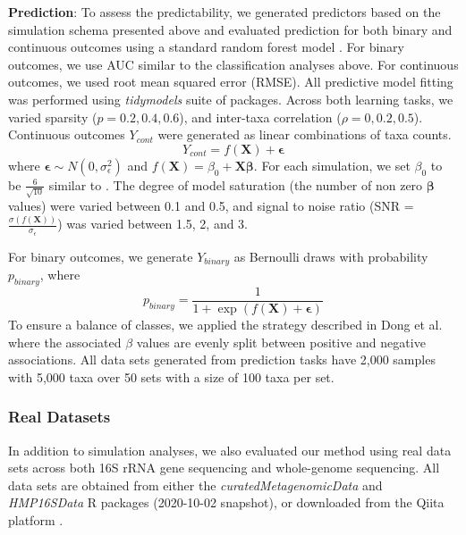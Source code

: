 \documentclass{article}
\begin{document}
\noindent \textbf{Prediction}: To assess the predictability, we generated predictors based on the simulation schema presented above and evaluated prediction for both binary and continuous outcomes using a standard random forest model \cite{breiman2001}. For binary outcomes, we use AUC similar to the classification analyses above. For continuous outcomes, we used root mean squared error (RMSE). All predictive model fitting was performed using \emph{tidymodels} \cite{kuhn2020} suite of packages. Across both learning tasks, we varied sparsity ($p = 0.2, 0.4, 0.6$), and inter-taxa correlation ($\rho = 0, 0.2, 0.5$). Continuous outcomes $Y_{cont}$ were generated as linear combinations of taxa counts.  
\begin{equation}
    Y_{cont} = f(\mathbf{X}) + \mathbf{\epsilon}
\end{equation}
where $\mathbf{\epsilon} \sim N(0, \sigma_{\epsilon}^2)$ and $f(\mathbf{X}) = \beta_0 + \mathbf{X}\mathbf{\beta}$. For each simulation, we set $\beta_0$ to be $\frac{6}{\sqrt{10}}$ similar to \cite{xiao2018}. The degree of model saturation (the number of non zero $\mathbf{\beta}$ values) were varied between 0.1 and 0.5, and signal to noise ratio (SNR = $\frac{\sigma(f(\mathbf{X}))}{\sigma_{\epsilon}}$) was varied between 1.5, 2, and 3. 

For binary outcomes, we generate $Y_{binary}$ as Bernoulli draws with probability $p_{binary}$, where 
\begin{equation}
    p_{binary} = \frac{1}{1 + \exp(f(\mathbf{X}) + \mathbf{\epsilon})}
\end{equation}
To ensure a balance of classes, we applied the strategy described in Dong et al. \cite{dong2020} where the associated $\beta$ values are evenly split between positive and negative associations. All data sets generated from prediction tasks have 2,000 samples with 5,000 taxa over 50 sets with a size of 100 taxa per set.  

\subsubsection*{Real Datasets}

In addition to simulation analyses, we also evaluated our method using real data sets across both 16S rRNA gene sequencing and whole-genome sequencing. All data sets are obtained from either the \emph{curatedMetagenomicData} \cite{pasolli2017} and \emph{HMP16SData} \cite{schiffer2019} R packages (2020-10-02 snapshot), or downloaded from the Qiita platform \cite{gonzalez2018}.  
\end{document}
